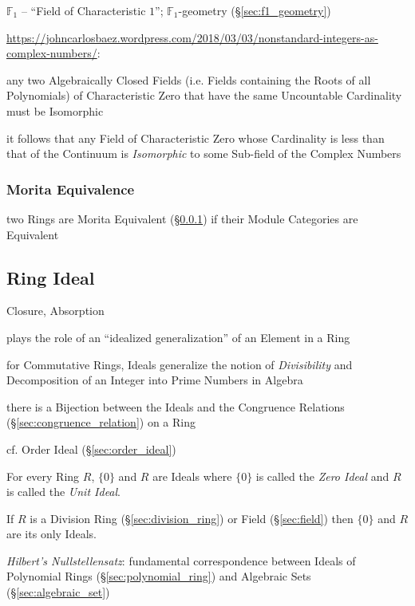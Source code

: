 \fist $\mathbb{F}_1$ -- ``Field of Characteristic $1$''; $\mathbb{F}_1$-geometry
(\S\ref{sec:f1_geometry})

\url{https://johncarlosbaez.wordpress.com/2018/03/03/nonstandard-integers-as-complex-numbers/}:

any two Algebraically Closed Fields (i.e. Fields containing the Roots of all
Polynomials) of Characteristic Zero that have the same Uncountable Cardinality
must be Isomorphic

it follows that any Field of Characteristic Zero whose Cardinality is less than
that of the Continuum is \emph{Isomorphic} to some Sub-field of the Complex
Numbers



\subsubsection{Morita Equivalence}\label{sec:morita_equivalence}

two Rings are Morita Equivalent (\S\ref{sec:morita_equivalence}) if their
Module Categories are Equivalent



\subsection{Ring Ideal}\label{sec:ring_ideal}

Closure, Absorption

plays the role of an ``idealized generalization'' of an Element in a Ring

for Commutative Rings, Ideals generalize the notion of \emph{Divisibility} and
Decomposition of an Integer into Prime Numbers in Algebra

there is a Bijection between the Ideals and the Congruence Relations
(\S\ref{sec:congruence_relation}) on a Ring

\fist cf. Order Ideal (\S\ref{sec:order_ideal})

For every Ring $R$, $\{0\}$ and $R$ are Ideals where $\{0\}$ is called
the \emph{Zero Ideal} and $R$ is called the \emph{Unit Ideal}.

If $R$ is a Division Ring (\S\ref{sec:division_ring}) or Field
(\S\ref{sec:field}) then $\{0\}$ and $R$ are its only Ideals.

\emph{Hilbert's Nullstellensatz}: fundamental correspondence between Ideals of
Polynomial Rings (\S\ref{sec:polynomial_ring}) and Algebraic Sets
(\S\ref{sec:algebraic_set})

